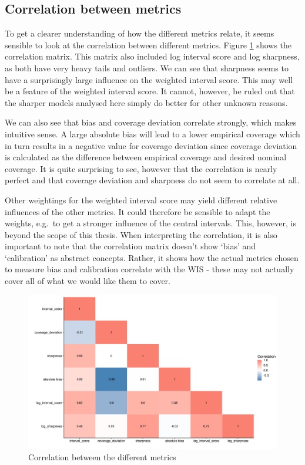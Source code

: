 \documentclass[
]{book}
\begin{document}
\hypertarget{correlation-between-metrics}{%
\subsection{Correlation between metrics}\label{correlation-between-metrics}}

To get a clearer understanding of how the different metrics relate, it seems sensible to look at the correlation between different metrics. Figure \ref{fig:correlation-map} shows the correlation matrix. This matrix also included log interval score and log sharpness, as both have very heavy tails and outliers. We can see that sharpness seems to have a surprisingly large influence on the weighted interval score. This may well be a feature of the weighted interval score. It cannot, however, be ruled out that the sharper models analysed here simply do better for other unknown reasons.

We can also see that bias and coverage deviation correlate strongly, which makes intuitive sense. A large absolute bias will lead to a lower empirical coverage which in turn results in a negative value for coverage deviation since coverage deviation is calculated as the difference between empirical coverage and desired nominal coverage. It is quite surprising to see, however that the correlation is nearly perfect and that coverage deviation and sharpness do not seem to correlate at all.

Other weightings for the weighted interval score may yield different relative influences of the other metrics. It could therefore be sensible to adapt the weights, e.g.~to get a stronger influence of the central intervals. This, however, is beyond the scope of this thesis. When interpreting the correlation, it is also important to note that the correlation matrix doesn't show `bias' and `calibration' as abstract concepts. Rather, it shows how the actual metrics chosen to measure bias and calibration correlate with the WIS - these may not actually cover all of what we would like them to cover.

\begin{figure}

{\centering \includegraphics[width=1\linewidth]{../visualisation/chapter-5-results/correlation-map} 

}

\caption{Correlation between the different metrics }\label{fig:correlation-map}
\end{figure}
\end{document}

